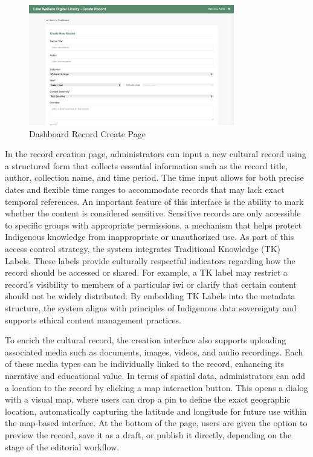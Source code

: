 \begin{figure}[H]
    \centering
    \includegraphics[width=0.8\textwidth]{screenshot/prototype_dashboard_createrecord.png}
    \caption{Dashboard Record Create Page}
    \label{fig:architecture}
\end{figure}
In the record creation page, administrators can input a new cultural record using a structured form that collects essential information such as the record title, author, collection name, and time period. The time input allows for both precise dates and flexible time ranges to accommodate records that may lack exact temporal references. An important feature of this interface is the ability to mark whether the content is considered sensitive. Sensitive records are only accessible to specific groups with appropriate permissions, a mechanism that helps protect Indigenous knowledge from inappropriate or unauthorized use. As part of this access control strategy, the system integrates Traditional Knowledge (TK) Labels. These labels provide culturally respectful indicators regarding how the record should be accessed or shared. For example, a TK label may restrict a record's visibility to members of a particular iwi or clarify that certain content should not be widely distributed. By embedding TK Labels into the metadata structure, the system aligns with principles of Indigenous data sovereignty and supports ethical content management practices.

To enrich the cultural record, the creation interface also supports uploading associated media such as documents, images, videos, and audio recordings. Each of these media types can be individually linked to the record, enhancing its narrative and educational value. In terms of spatial data, administrators can add a location to the record by clicking a map interaction button. This opens a dialog with a visual map, where users can drop a pin to define the exact geographic location, automatically capturing the latitude and longitude for future use within the map-based interface. At the bottom of the page, users are given the option to preview the record, save it as a draft, or publish it directly, depending on the stage of the editorial workflow.

